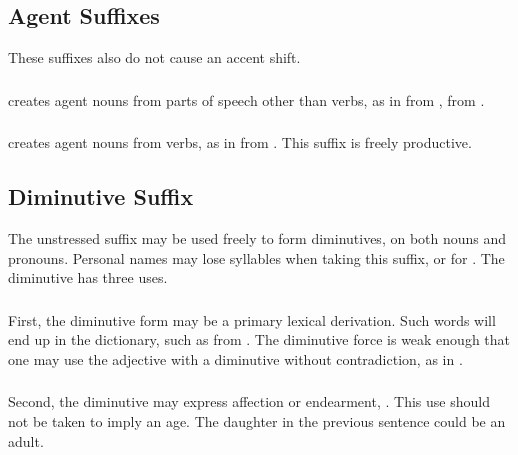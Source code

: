 \subsection{Agent Suffixes} These suffixes also do not cause an accent
shift.

\subsubsection{}  creates agent nouns from parts of speech
other than verbs, as in   from
 ,   from  .

\subsubsection{}  creates agent nouns from verbs, as in
  from  .  This suffix is freely
productive. 



\subsection{Diminutive Suffix} The unstressed suffix  may be
used freely to form diminutives, on both nouns and pronouns.  Personal
names may lose syllables when taking this suffix,  or
 for .  The diminutive has three uses.
\label{lingop:dimin}

\subsubsection{} First, the diminutive form may be a primary lexical
derivation.  Such words will end up in the dictionary, such as
  from  .  The
diminutive force is weak enough that one may use the adjective
  with a diminutive without contradiction, as in
 .

\subsubsection{} Second, the diminutive may express affection or
endearment,  . This use should not be taken to imply an age.  The daughter
in the previous sentence could be an adult.

